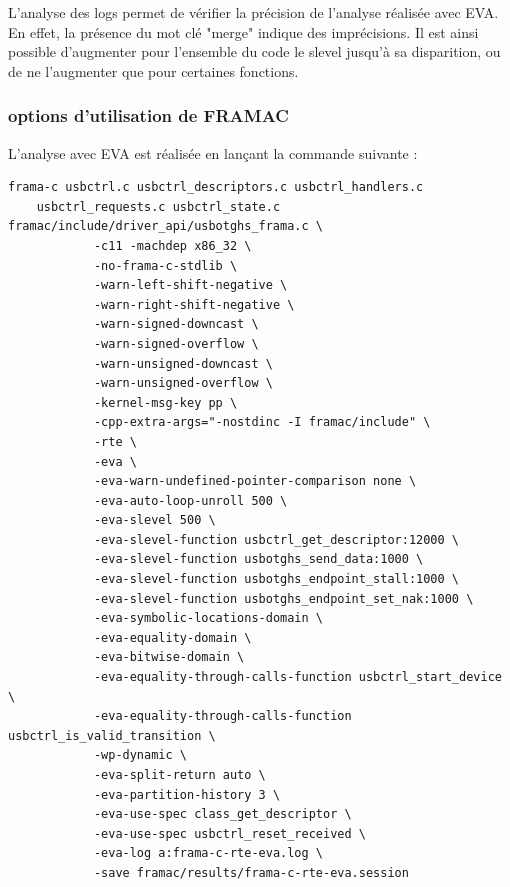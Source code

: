 \noindent L'analyse des logs permet de vérifier la précision de l'analyse réalisée avec EVA. En effet, la présence du mot clé "merge" indique des imprécisions. Il est ainsi possible d'augmenter pour l'ensemble du code le slevel jusqu'à sa disparition, ou de ne l'augmenter que pour certaines fonctions.

\subsubsection{options d'utilisation de FRAMAC}\label{optionsEVA}

L'analyse avec EVA est réalisée en lançant la commande suivante :

\begin{lstlisting}[style=CStyle]
	frama-c usbctrl.c usbctrl_descriptors.c usbctrl_handlers.c
	usbctrl_requests.c usbctrl_state.c framac/include/driver_api/usbotghs_frama.c \
			-c11 -machdep x86_32 \
	        -no-frama-c-stdlib \
	        -warn-left-shift-negative \
	        -warn-right-shift-negative \
	        -warn-signed-downcast \
	        -warn-signed-overflow \
	        -warn-unsigned-downcast \
	        -warn-unsigned-overflow \
			-kernel-msg-key pp \
			-cpp-extra-args="-nostdinc -I framac/include" \
		    -rte \
		    -eva \
		    -eva-warn-undefined-pointer-comparison none \
		    -eva-auto-loop-unroll 500 \
		    -eva-slevel 500 \
		    -eva-slevel-function usbctrl_get_descriptor:12000 \
		    -eva-slevel-function usbotghs_send_data:1000 \
		    -eva-slevel-function usbotghs_endpoint_stall:1000 \
		    -eva-slevel-function usbotghs_endpoint_set_nak:1000 \
		    -eva-symbolic-locations-domain \
		    -eva-equality-domain \
		    -eva-bitwise-domain \
		    -eva-equality-through-calls-function usbctrl_start_device \
		    -eva-equality-through-calls-function usbctrl_is_valid_transition \
  			-wp-dynamic \
		    -eva-split-return auto \
		    -eva-partition-history 3 \
		    -eva-use-spec class_get_descriptor \
		    -eva-use-spec usbctrl_reset_received \
		    -eva-log a:frama-c-rte-eva.log \
			-save framac/results/frama-c-rte-eva.session
\end{lstlisting}

